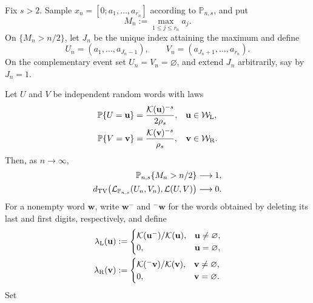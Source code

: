 \begin{theorem}
\label{thm:brocot-condensation}
Fix \(s>2\).  Sample
\(x_n=[0;a_1,\ldots,a_{r_n}]\) according to \(\mathbb P_{n,s}\), and put
\[
 M_n:=\max_{1\le j\le r_n}a_j.
\]
On \(\{M_n>n/2\}\), let \(J_n\) be the unique index attaining the maximum
and define
\[
 U_n=(a_1,\ldots,a_{J_n-1}),
 \qquad
 V_n=(a_{J_n+1},\ldots,a_{r_n}).
\]
On the complementary event set \(U_n=V_n=\varnothing\), and extend \(J_n\)
arbitrarily, say by \(J_n=1\).

Let \(U\) and \(V\) be independent random words with laws
\begin{equation}
 \begin{aligned}
  \mathbb P\{U=\mathbf u\}
  &=\frac{\mathcal K(\mathbf u)^{-s}}{2\rho_s},
  &\mathbf u&\in\mathcal W_{\rm L},\\
  \mathbb P\{V=\mathbf v\}
  &=\frac{\mathcal K(\mathbf v)^{-s}}{\rho_s},
  &\mathbf v&\in\mathcal W_{\rm R}.
 \end{aligned}
 \label{eq:limiting-context-laws}
\end{equation}
Then, as \(n\to\infty\),
\begin{align}
 \mathbb P_{n,s}\{M_n>n/2\}&\longrightarrow1,
 \label{eq:brocot-unique-condensate}\\
 d_{\rm TV}\bigl(\mathcal L_{\mathbb P_{n,s}}(U_n,V_n),
                   \mathcal L(U,V)\bigr)&\longrightarrow0.
 \label{eq:brocot-context-tv}
\end{align}
For a nonempty word \(\mathbf w\), write \(\mathbf w^-\) and
\({}^-\mathbf w\) for the words obtained by deleting its last and first
digits, respectively, and define
\begin{equation}
 \begin{aligned}
 \lambda_{\rm L}(\mathbf u)&:=
 \begin{cases}
  \mathcal K(\mathbf u^-)/\mathcal K(\mathbf u),&\mathbf u\ne\varnothing,\\
  0,&\mathbf u=\varnothing,
 \end{cases}\\
 \lambda_{\rm R}(\mathbf v)&:=
 \begin{cases}
  \mathcal K({}^-\mathbf v)/\mathcal K(\mathbf v),&\mathbf v\ne\varnothing,\\
  0,&\mathbf v=\varnothing.
 \end{cases}
 \end{aligned}
 \label{eq:continuant-boundary-ratios}
\end{equation}
Set

\end{theorem}
